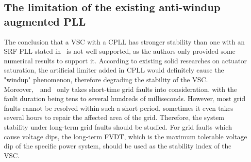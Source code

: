\documentclass[10pt,final,journal,twoside]{IEEEtran}
\begin{document}
\subsection{The limitation of the existing anti-windup augmented PLL}
The conclusion that a VSC with a CPLL has stronger stability than one with an SRF-PLL stated in~\cite{tang2023} is not well-supported, as the authors only provided some numerical results to support it. According to
existing solid researches on actuator saturation, the artificial limiter added in CPLL would definitely cause the "windup" phenomenon, therefore degrading the stability of the VSC.
Moreover,~\cite{tang2023}~and~\cite{chen2023} only takes short-time grid faults into consideration, with the fault duration being tens to several hundreds of milliseconds. However, most grid faults
cannot be resolved within such a short period, sometimes it even takes several hours to repair the affected area of the grid. Therefore, the system stability under long-term grid faults should be studied.
For grid faults which cause voltage dips, the long-term FVDT, which is the maximum tolerable voltage dip of the specific power system, should be used as the stability index of the VSC.
\end{document}
